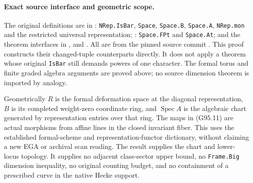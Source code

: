\paragraph{Exact source interface and geometric scope.}
The original definitions are in
: \texttt{NRep.IsBar},
\texttt{Space}, \texttt{Space.B}, \texttt{Space.A},
\texttt{NRep.mon} and the restricted universal representation;
: \texttt{Space.FPt} and \texttt{Space.At};
and the theorem interfaces in
,
 and
.
All are from the pinned source commit
.
This proof constructs their changed-tuple counterparts
directly.  It does not apply a theorem whose original
\texttt{IsBar} still demands powers of one character.
The formal torus and finite graded algebra arguments
are proved above; no source dimension theorem is
imported by analogy.

Geometrically \(R\) is the formal deformation space
at the diagonal representation, \(B\) is its
completed weight-zero coordinate ring, and
\(\operatorname{Spec}A\) is the algebraic chart
generated by representation entries over that ring.
The maps in (G95.11) are actual morphisms from
affine lines in the closed invariant fiber.
This uses the established formal-scheme and
representation-functor dictionary, without claiming
a new EGA or archival scan reading.
The result supplies the chart and lower-locus topology.
It supplies no adjacent class-sector upper bound,
no \texttt{Frame.Big} dimension inequality, no
original counting budget, and no containment of a
prescribed curve in the native Hecke support.
